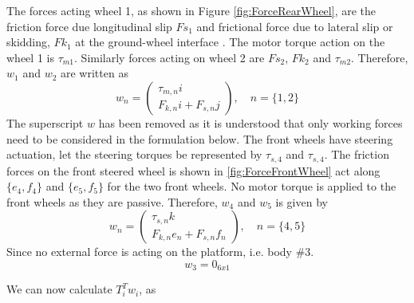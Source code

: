 {The forces acting wheel 1, as shown in Figure \ref{fig:ForceRearWheel},  are the friction force due longitudinal slip $Fs_1$ and frictional force  due to lateral slip or skidding, $Fk_1$ at the ground-wheel interface . The motor torque action on the wheel 1 is $\tau_{m1}$.  Similarly forces acting on wheel 2 are $Fs_2$, $Fk_2$ and $\tau_{m2}$. Therefore, $w_1$ and $w_2$ are written as 
\begin{equation}
\label{eqn:wrenchWheelSlipRear}
 w_n=\begin{pmatrix}
\tau_{m,n}i\\
F_{k,n}i+F_{s,n}j
\end{pmatrix},  \quad n=\{1,2\}
\end{equation}
The superscript $w$ has been removed as it is understood that only working forces need to be considered in the formulation below. 
The front wheels have steering actuation, let the steering  torques be represented by $\tau_{s,4}$ and  $\tau_{s,4}$. The friction forces on the front steered wheel is shown in \ref{fig:ForceFrontWheel} act along $\{e_4,f_4\}$ and $\{e_5,f_5\}$ for the two front wheels. No motor torque is applied to the front wheels as they are passive. Therefore, $w_4$ and $w_5$ is given by
\begin{equation}
\label{eqn:wrenchWheelSlipFront}
w_n=\begin{pmatrix}
\tau_{s,n}k\\
F_{k,n}e_n+F_{s,n}f_n
\end{pmatrix},  \quad n=\{4,5\}
\end{equation}
Since no external force is acting on the platform, i.e. body \#3. \[w_3=0_{6x1}\]

We can now calculate $T_i^Tw_i$, as

}
